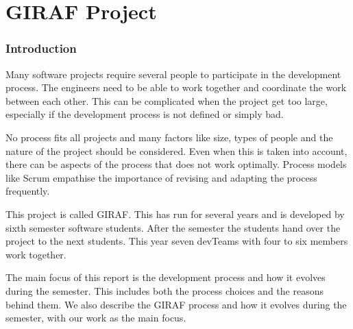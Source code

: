 \part{GIRAF Project}

\section{Introduction}

Many software projects require several people to participate in the development process. The engineers need to be able to work together and coordinate the work between each other. This can be complicated when the project get too large, especially if the development process is not defined or simply bad.

No process fits all projects and many factors like size, types of people and the nature of the project should be considered. Even when this is taken into account, there can be aspects of the process that does not work optimally. Process models like \gls{Scrum} empathise the importance of revising and adapting the process frequently\cite{Scrum}.

This project is called GIRAF. This has run for several years and is developed by sixth semester software students. After the semester the students hand over the project to the next students. This year seven \glspl{devTeam} with four to six members work together.

The main focus of this report is the development process and how it evolves during the semester. This includes both the process choices and the reasons behind them. We also describe the GIRAF process and how it evolves during the semester, with our work as the main focus.